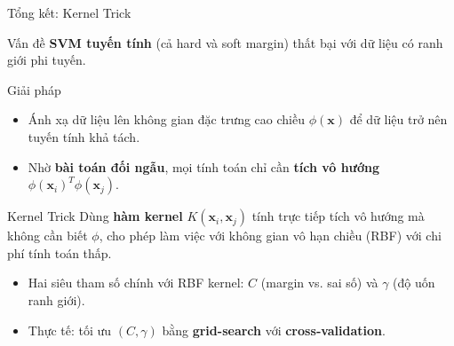 \begin{frame}{Tổng kết: Kernel Trick}
  \begin{block}{Vấn đề}
    \textbf{SVM tuyến tính} (cả hard và soft margin) thất bại với dữ liệu có ranh giới phi tuyến.
  \end{block}
  \begin{block}{Giải pháp}
    \begin{itemize}
      \item Ánh xạ dữ liệu lên không gian đặc trưng cao chiều $\phi(\mathbf{x})$ để dữ liệu trở nên tuyến tính khả tách.
      \item Nhờ \textbf{bài toán đối ngẫu}, mọi tính toán chỉ cần \textbf{tích vô hướng} $\phi(\mathbf{x}_i)^T \phi(\mathbf{x}_j)$.
    \end{itemize}
  \end{block}
  \begin{exampleblock}{Kernel Trick}
    Dùng \textbf{hàm kernel} $K(\mathbf{x}_i, \mathbf{x}_j)$ tính trực tiếp tích vô hướng mà không cần biết $\phi$, cho phép làm việc với không gian vô hạn chiều (RBF) với chi phí tính toán thấp.
  \end{exampleblock}
  \begin{itemize}
    \item Hai siêu tham số chính với RBF kernel: $C$ (margin vs. sai số) và $\gamma$ (độ uốn ranh giới).
    \item Thực tế: tối ưu $(C,\gamma)$ bằng \textbf{grid-search} với \textbf{cross‑validation}.
  \end{itemize}
  \vspace{0.2cm}
  \centering
\end{frame}